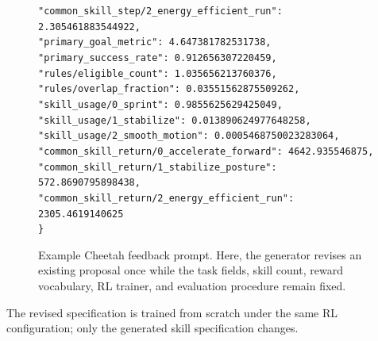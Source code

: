 \documentclass[conference,letterpaper,10pt]{IEEEtran}
\begin{document}
\begin{figure}[!t]
{\begin{minipage}{0.94\textwidth}
\texttt{\hspace*{1em}"common\_skill\_step/2\_energy\_efficient\_run": 2.305461883544922,}\\
\texttt{\hspace*{1em}"primary\_goal\_metric": 4.647381782531738,}\\
\texttt{\hspace*{1em}"primary\_success\_rate": 0.912656307220459,}\\
\texttt{\hspace*{1em}"rules/eligible\_count": 1.035656213760376,}\\
\texttt{\hspace*{1em}"rules/overlap\_fraction": 0.03551562875509262,}\\
\texttt{\hspace*{1em}"skill\_usage/0\_sprint": 0.9855625629425049,}\\
\texttt{\hspace*{1em}"skill\_usage/1\_stabilize": 0.013890624977648258,}\\
\texttt{\hspace*{1em}"skill\_usage/2\_smooth\_motion": 0.0005468750023283064,}\\
\texttt{\hspace*{1em}"common\_skill\_return/0\_accelerate\_forward": 4642.935546875,}\\
\texttt{\hspace*{1em}"common\_skill\_return/1\_stabilize\_posture": 572.8690795898438,}\\
\texttt{\hspace*{1em}"common\_skill\_return/2\_energy\_efficient\_run": 2305.4619140625}\\
\texttt{\}}
\end{minipage}
}

\caption{Example Cheetah feedback prompt. Here, the generator revises an existing proposal once while the task fields, skill count, reward vocabulary, RL trainer, and evaluation procedure remain fixed.}
\label{fig:llmfeedback}
\end{figure}

The revised specification is trained from scratch under the same RL configuration; only the generated skill specification changes.
\end{document}
